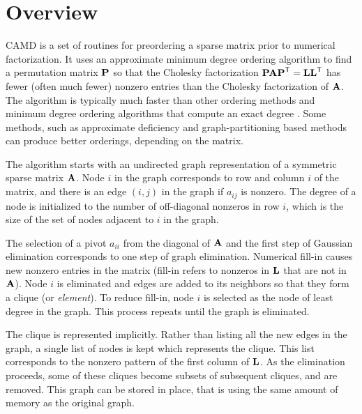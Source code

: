 \documentclass[11pt]{article}
\newcommand{\m}[1]{{\bf{#1}}}       %
\newcommand{\tr}{^{\sf T}}          %
\begin{document}
\newpage
\section{Overview}

CAMD is a set of routines for preordering a sparse matrix prior to
numerical factorization.  It uses an approximate minimum degree ordering
algorithm \cite{AmestoyDavisDuff96,AmestoyDavisDuff04}
to find a permutation matrix $\m{P}$
so that the Cholesky factorization $\m{PAP}\tr=\m{LL}\tr$ has fewer
(often much fewer) nonzero entries than the Cholesky factorization of $\m{A}$.
The algorithm is typically much faster than other ordering methods
and  minimum degree ordering
algorithms that compute an exact degree \cite{GeorgeLiu89}.
Some methods, such as approximate deficiency
\cite{RothbergEisenstat98} and graph-partitioning based methods
\cite{Chaco,KarypisKumar98e,PellegriniRomanAmestoy00,schu:01}
can produce better orderings, depending on the matrix.

The algorithm starts with an undirected graph representation of a
symmetric sparse matrix $\m{A}$.  Node $i$ in the graph corresponds to row
and column $i$ of the matrix, and there is an edge $(i,j)$ in the graph if
$a_{ij}$ is nonzero.
The degree of a node is initialized to the number of off-diagonal nonzeros
in row $i$, which is the size of the set of nodes
adjacent to $i$ in the graph.

The selection of a pivot $a_{ii}$ from the diagonal of $\m{A}$ and the first
step of Gaussian elimination corresponds to one step of graph elimination.
Numerical fill-in causes new nonzero entries in the matrix
(fill-in refers to
nonzeros in $\m{L}$ that are not in $\m{A}$).
Node $i$ is eliminated and edges are added to its neighbors
so that they form a clique (or {\em element}).  To reduce fill-in,
node $i$ is selected as the node of least degree in the graph.
This process repeats until the graph is eliminated.

The clique is represented implicitly.  Rather than listing all the
new edges in the graph, a single list of nodes is kept which represents
the clique.  This list corresponds to the nonzero pattern of the first
column of $\m{L}$.  As the elimination proceeds, some of these cliques
become subsets of subsequent cliques, and are removed.   This graph
can be stored in place, that is
using the same amount of memory as the original graph.
\end{document}

